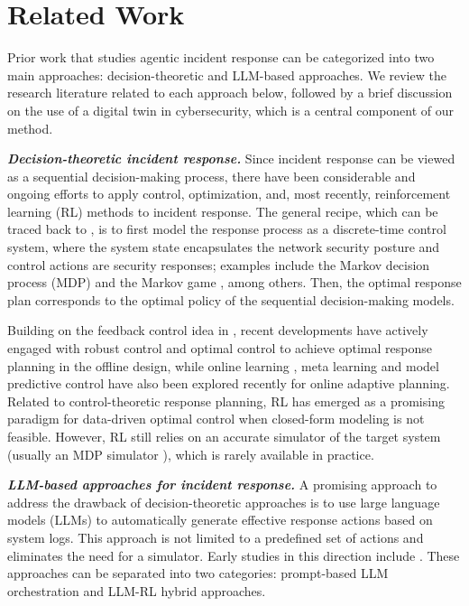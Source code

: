 \documentclass[sigconf]{acmart}
\begin{document}
\section{Related Work}
Prior work that studies agentic incident response can be categorized into two main approaches: decision-theoretic and LLM-based approaches. We review the research literature related to each approach below, followed by a brief discussion on the use of a digital twin in cybersecurity, which is a central component of our method.

\vspace{2.5mm}
\noindent\textit{\textbf{Decision-theoretic incident response.}}
Since incident response can be viewed as a sequential decision-making process, there have been considerable and ongoing efforts to apply control, optimization, and, most recently, reinforcement learning (RL) methods to incident response. The general recipe, which can be traced back to \cite{kreidl04feedback-defense}, is to first model the response process as a discrete-time control system, where the system state encapsulates the network security posture and control actions are security responses; examples include the Markov decision process (MDP) \cite{burnap25acd-survey} and the Markov game \cite{alpcan10book}, among others. Then, the optimal response plan corresponds to the optimal policy of the sequential decision-making models. 

Building on the feedback control idea in \cite{kreidl04feedback-defense}, recent developments \cite{iannucci18mdp-cyber,miehling22control-cyber} have actively engaged with robust control and optimal control to achieve optimal response planning in the offline design, while online learning \cite{kim-tao25col}, meta learning \cite{tao23ztd} and model predictive control \cite{kim-tao25quantization} have also been explored recently for online adaptive planning. Related to control-theoretic response planning, RL has emerged as a promising paradigm for data-driven optimal control when closed-form modeling is not feasible. However, RL still relies on an accurate simulator of the target system (usually an MDP simulator \cite{reddi23rl4sec}), which is rarely available in practice.

\vspace{2.5mm}
\noindent\textit{\textbf{LLM-based approaches for incident response.}}
A promising approach to address the drawback of decision-theoretic approaches is to use large language models (LLMs) to automatically generate effective response actions based on system logs. This approach is not limited to a predefined set of actions and eliminates the need for a simulator. Early studies in this direction include \cite{hamoun25llm-acd, guo25ircopilot, tao25deception,wang2026cybergym}. These approaches can be separated into two categories: prompt-based LLM orchestration and LLM-RL hybrid approaches. 
\end{document}
